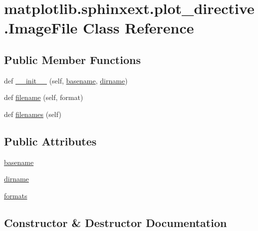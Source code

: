 \hypertarget{classmatplotlib_1_1sphinxext_1_1plot__directive_1_1ImageFile}{}\section{matplotlib.\+sphinxext.\+plot\+\_\+directive.\+Image\+File Class Reference}
\label{classmatplotlib_1_1sphinxext_1_1plot__directive_1_1ImageFile}
\subsection*{Public Member Functions}
\begin{DoxyCompactItemize}
\item 
def \hyperlink{classmatplotlib_1_1sphinxext_1_1plot__directive_1_1ImageFile_ab3e9f6191ed3ddbb074e8bc1cbf22329}{\+\_\+\+\_\+init\+\_\+\+\_\+} (self, \hyperlink{classmatplotlib_1_1sphinxext_1_1plot__directive_1_1ImageFile_acb3c6254d4d7a03717524c5673237ce6}{basename}, \hyperlink{classmatplotlib_1_1sphinxext_1_1plot__directive_1_1ImageFile_a6298bfcab8e409e6d2861d8638a34a80}{dirname})
\item 
def \hyperlink{classmatplotlib_1_1sphinxext_1_1plot__directive_1_1ImageFile_a8903a9f038c254cd28b0ef45cbf58a41}{filename} (self, format)
\item 
def \hyperlink{classmatplotlib_1_1sphinxext_1_1plot__directive_1_1ImageFile_a1892bd38112335a31e2b75df9d48ce6d}{filenames} (self)
\end{DoxyCompactItemize}
\subsection*{Public Attributes}
\begin{DoxyCompactItemize}
\item 
\hyperlink{classmatplotlib_1_1sphinxext_1_1plot__directive_1_1ImageFile_acb3c6254d4d7a03717524c5673237ce6}{basename}
\item 
\hyperlink{classmatplotlib_1_1sphinxext_1_1plot__directive_1_1ImageFile_a6298bfcab8e409e6d2861d8638a34a80}{dirname}
\item 
\hyperlink{classmatplotlib_1_1sphinxext_1_1plot__directive_1_1ImageFile_ad4bf942871244cad05ce9e0f2a69ac5b}{formats}
\end{DoxyCompactItemize}


\subsection{Constructor \& Destructor Documentation}
\mbox{\label{classmatplotlib_1_1sphinxext_1_1plot__directive_1_1ImageFile_ab3e9f6191ed3ddbb074e8bc1cbf22329}} 
